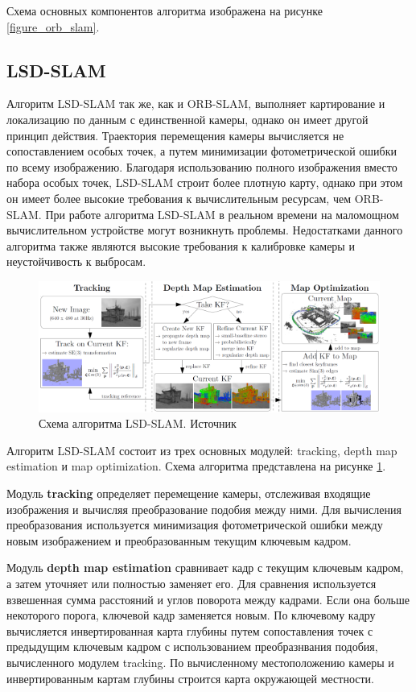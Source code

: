 \documentclass{mipt-thesis-ms}
\begin{document}
	Схема основных компонентов алгоритма изображена на рисунке \ref{figure_orb_slam}.
	
	\subsection{LSD-SLAM}
	
	Алгоритм LSD-SLAM \cite{engel2014lsd} так же, как и ORB-SLAM, выполняет картирование и локализацию по данным с единственной камеры, однако он имеет другой принцип действия. Траектория перемещения камеры вычисляется не сопоставлением особых точек, а путем минимизации фотометрической ошибки по всему изображению. Благодаря использованию полного изображения вместо набора особых точек, LSD-SLAM строит более плотную карту, однако при этом он имеет более высокие требования к вычислительным ресурсам, чем ORB-SLAM. При работе алгоритма LSD-SLAM в реальном времени на маломощном вычислительном устройстве могут возникнуть проблемы. Недостатками данного алгоритма также являются высокие требования к калибровке камеры и неустойчивость к выбросам.
	
	\begin{figure}
		\includegraphics[width=1.0\textwidth]{img/lsd_slam_scheme.png}
		\caption{Схема алгоритма LSD-SLAM. Источник \cite{engel2014lsd}}
		\label{figure_lsd_slam}
	\end{figure}
	
	Алгоритм LSD-SLAM состоит из трех основных модулей: tracking, depth map estimation и map optimization. Схема алгоритма представлена на рисунке \ref{figure_lsd_slam}.
	
	Модуль \textbf{tracking} определяет перемещение камеры, отслеживая входящие изображения и вычисляя преобразование подобия между ними. Для вычисления преобразования используется минимизация фотометрической ошибки между новым изображением и преобразованным текущим ключевым кадром.
	
	Модуль \textbf{depth map estimation} сравнивает кадр с текущим ключевым кадром, а затем уточняет или полностью заменяет его. Для сравнения используется взвешенная сумма расстояний и углов поворота между кадрами. Если она больше некоторого порога, ключевой кадр заменяется новым. По ключевому кадру вычисляется инвертированная карта глубины путем сопоставления точек с предыдущим ключевым кадром с использованием преобразнвания подобия, вычисленного модулем tracking. По вычисленному местоположению камеры и инвертированным картам глубины строится карта окружающей местности.
	
\end{document}
